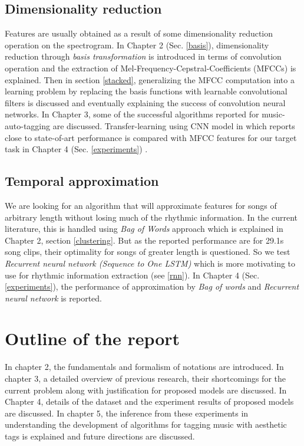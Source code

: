 \subsection{Dimensionality reduction}
Features are usually obtained as a result of some dimensionality reduction operation on the spectrogram. In Chapter 2 (Sec. \ref{basis}), dimensionality reduction through \textit{basis transformation} is introduced in terms of convolution operation and the extraction of Mel-Frequency-Cepstral-Coefficients (MFCCs) is explained. Then in section \ref{stacked}, generalizing the MFCC computation into a learning problem by replacing the basis functions with learnable convolutional filters is discussed and eventually explaining the success of convolution neural networks. In Chapter 3, some of the successful algorithms reported for music-auto-tagging are discussed. Transfer-learning using CNN model in \cite{choi_cnn} which reports close to state-of-art performance is compared with MFCC features for our target task in Chapter 4 (Sec. \ref{experiments}) .
    
\subsection{Temporal approximation}
We are looking for an algorithm that will approximate features for songs of arbitrary length without losing much of the rhythmic information. In the current literature, this is handled using \textit{Bag of Words} approach which is explained in Chapter 2, section \ref{clustering}. But as the reported performance are for 29.1s song clips, their optimality for songs of greater length is questioned. So we test \textit{Recurrent neural network (Sequence to One LSTM)} which is more motivating to use for rhythmic information extraction (see \ref{rnn}). In Chapter 4 (Sec. \ref{experiments}), the performance of approximation by \textit{Bag of words} and \textit{Recurrent neural network} is reported.



\section{Outline of the report}
In chapter 2, the fundamentals and formalism of notations are introduced. In chapter 3, a detailed overview of previous research, their shortcomings for the current problem along with justification for proposed models are discussed. In Chapter 4, details of the dataset and the experiment results of proposed models are discussed. In chapter 5, the inference from these experiments in understanding the development of algorithms for tagging music with aesthetic tags is explained and future directions are discussed. 






